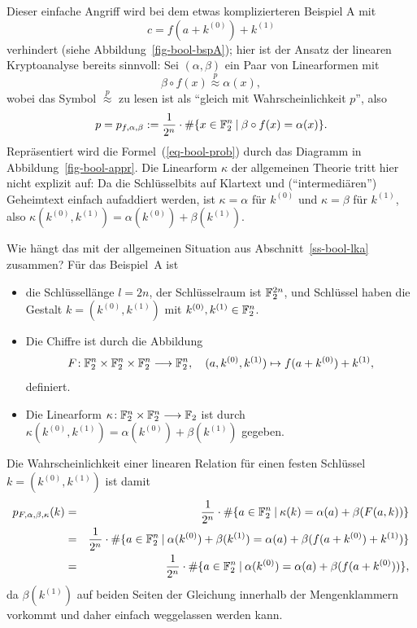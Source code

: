 \begin{refsegment}
Dieser einfache Angriff wird bei dem etwas komplizierteren Beispiel A mit
\[
   c = f(a+k^{(0)}) + k^{(1)}
\]
verhindert (siehe Abbildung~\ref{fig-bool-bspA}); hier ist der Ansatz der linearen
Kryptoanalyse
bereits sinnvoll: Sei $(\alpha,\beta)$ ein Paar von Linearformen
mit
\begin{equation}\label{eq-bool-prob}
     \beta\circ f(x) \stackrel{p}{\approx} \alpha(x),
\end{equation}
wobei das Symbol $\stackrel{p}{\approx}$ zu lesen ist als
"`gleich mit Wahrscheinlichkeit $p$"', also
\[
     p = p_{f,\alpha,\beta} :=
     \frac{1}{2^{n}} \cdot \#\{x \in \mathbb{F}_2^n \:|\: \beta\circ f(x) = \alpha(x) \}.
\]
Repräsentiert wird die Formel~(\ref{eq-bool-prob}) durch das Diagramm in
Abbildung~\ref{fig-bool-appr}. Die Linearform $\kappa$ der
allgemeinen Theorie tritt hier nicht explizit auf: Da die
Schlüsselbits auf Klartext und ("`intermediären"') Geheimtext einfach
aufaddiert werden, ist $\kappa = \alpha$ für $k^{(0)}$ und $\kappa = \beta$
für $k^{(1)}$, also $\kappa(k^{(0)}, k^{(1)}) = \alpha(k^{(0)}) + \beta(k^{(1)})$.

Wie hängt das mit der allgemeinen Situation aus Abschnitt~\ref{ss-bool-lka}
zusammen? Für das Beispiel~A ist
\begin{itemize}
   \item die Schlüssellänge $l = 2n$, der Schlüsselraum ist $\mathbb{F}_2^{2n}$, und
      Schlüssel haben die Gestalt $k = (k^{(0)},k^{(1)})$ mit $k^{(0)}, k^{(1)} \in \mathbb{F}_2^n$.
   \item Die Chiffre ist durch die Abbildung
\[
     F\!: \mathbb{F}_2^n \times \mathbb{F}_2^n \times \mathbb{F}_2^n \longrightarrow \mathbb{F}_2^n,
     \quad (a, k^{(0)}, k^{(1)}) \mapsto f(a + k^{(0)}) + k^{(1)},
\]
      definiert.
   \item Die Linearform $\kappa\!: \mathbb{F}_2^n \times \mathbb{F}_2^n \longrightarrow \mathbb{F}_2$
      ist durch $\kappa(k^{(0)},k^{(1)}) = \alpha(k^{(0)}) + \beta(k^{(1)})$ gegeben.
\end{itemize}
Die Wahrscheinlichkeit einer linearen Relation für einen festen
Schlüssel \mbox{$k = (k^{(0)},k^{(1)})$} ist damit
\begin{eqnarray*}
    p_{F,\alpha,\beta,\kappa}(k) & = & \frac{1}{2^n} \cdot
      \#\{a \in \mathbb{F}_2^n \:|\: \kappa(k) = \alpha(a) + \beta(F(a,k)) \} \\
     & = & \frac{1}{2^n} \cdot
      \#\{a \in \mathbb{F}_2^n \:|\: \alpha(k^{(0)}) + \beta(k^{(1)}) = \alpha(a) + \beta(f(a + k^{(0)}) + k^{(1)}) \} \\
     & = & \frac{1}{2^n} \cdot
      \#\{a \in \mathbb{F}_2^n \:|\: \alpha(k^{(0)}) = \alpha(a) + \beta(f(a + k^{(0)})) \},
\end{eqnarray*}
da $\beta(k^{(1)})$ auf beiden Seiten der Gleichung innerhalb der Mengenklammern
vorkommt und daher einfach weggelassen werden kann.


\end{refsegment}
